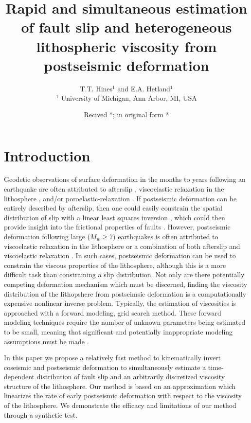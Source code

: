 \documentclass[extra,mreferee]{gji}
\title[Estimation of slip and viscosity from postseismic
  deformation]{Rapid and simultaneous estimation of fault slip and
  heterogeneous lithospheric viscosity from postseismic deformation}
\author[T.T. Hines and E.A Hetland]{T.T. Hines$^1$ and
  E.A. Hetland$^1$\\ $^1$ University of Michigan, Ann Arbor, MI, USA}
\date{Recived *; in original form *}
\begin{document}
\label{firstpage}

\maketitle

\begin{summary}
\end{summary}

\begin{keywords}
\end{keywords}

\section{Introduction}
Geodetic observations of surface deformation in the months to years
following an earthquake are often attributed to afterslip
\citep[e.g.][]{M1991}, viscoelastic relaxation in the lithosphere
\citep[e.g.][]{NM1974}, and/or poroelastic-relaxation
\citep[e.g.][]{P1998,J2003}.  If postseismic deformation can be
entirely described by afterslip, then one could easily constrain the
spatial distribution of slip with a linear least squares
inversion \citep[e.g.][]{H1987,B2002,F2007}, which could then provide
insight into the frictional properties of faults
\citep[e.g.][]{H2006,B2009}.  However, postseismic deformation
following large ($M_w\geq$7) earthquakes is often attributed to
viscoelastic relaxation in the lithosphere
\citep[e.g.][]{HH2003,P2003,P2005} or a combination of both afterslip
and viscoelastic relaxation \citep[e.g.][]{F2006,H2009,J2009,R2015}.
In such cases, postseismic deformation can be used to constrain the
viscous properties of the lithosphere, although this is a more
difficult task than constraining a slip distribution.  Not only are
there potentially competing deformation mechanism which must be
discerned, finding the viscosity distribution of the lithopshere from
postseimsic deformation is a computationally expensive nonlinear
inverse problem.  Typically, the estimation of viscosities is
approached with a forward modeling, grid search method.  These forward
modeling techniques require the number of unknown parameters being
estimated to be small, meaning that significant and potentially
inappropriate modeling assumptions must be made \citep{RG2008,H2013}.

In this paper we propose a relatively fast method to kinematically
invert coseismic and postseismic deformation to simultaneously
estimate a time-dependent distribution of fault slip and an
arbitrarily discretized viscosity structure of the lithosphere.  Our
method is based on an approximation which linearizes the rate of early
postseismic deformation with respect to the viscosity of the
lithosphere.  We demonstrate the efficacy and limitations of our
method through a synthetic test.
\end{document}
